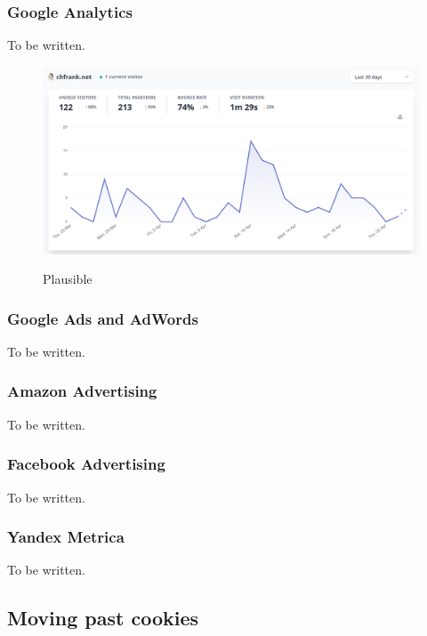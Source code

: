 \subsubsection{Google Analytics}

To be written.

\begin{figure}[H]
\centering
\caption {Plausible}
\includegraphics[width=\linewidth]{images/plausible.png}
\label{fig:plausible}
\end{figure}

\subsubsection{Google Ads and AdWords}

To be written.

\subsubsection{Amazon Advertising}

To be written.

\subsubsection{Facebook Advertising}

To be written.

\subsubsection{Yandex Metrica}

To be written.

\subsection{Moving past cookies}

